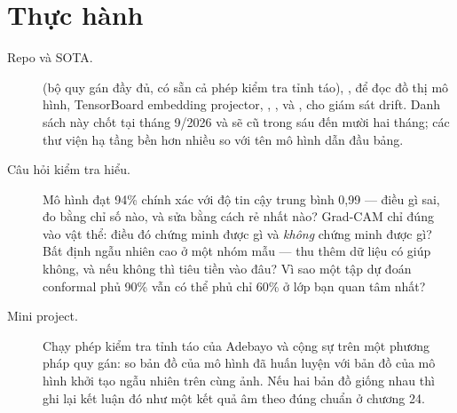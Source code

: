 \documentclass[../../deep_learning.tex]{subfiles}
\begin{document}
\section{Thực hành}
\begin{description}
\item[Repo và SOTA.]  (bộ quy gán đầy đủ, có sẵn cả phép kiểm tra tỉnh táo), ,  để đọc đồ thị mô hình, TensorBoard embedding projector, , ,  và ,  cho giám sát drift. Danh sách này chốt tại tháng 9/2026 và sẽ cũ trong sáu đến mười hai tháng; các thư viện hạ tầng bền hơn nhiều so với tên mô hình dẫn đầu bảng.
\item[Câu hỏi kiểm tra hiểu.] Mô hình đạt 94\% chính xác với độ tin cậy trung bình 0,99 --- điều gì sai, đo bằng chỉ số nào, và sửa bằng cách rẻ nhất nào? Grad-CAM chỉ đúng vào vật thể: điều đó chứng minh được gì và \emph{không} chứng minh được gì? Bất định ngẫu nhiên cao ở một nhóm mẫu --- thu thêm dữ liệu có giúp không, và nếu không thì tiêu tiền vào đâu? Vì sao một tập dự đoán conformal phủ 90\% vẫn có thể phủ chỉ 60\% ở lớp bạn quan tâm nhất?
\item[Mini project.] Chạy phép kiểm tra tỉnh táo của Adebayo và cộng sự trên một phương pháp quy gán: so bản đồ của mô hình đã huấn luyện với bản đồ của mô hình khởi tạo ngẫu nhiên trên cùng ảnh. Nếu hai bản đồ giống nhau thì ghi lại kết luận đó như một kết quả âm theo đúng chuẩn ở chương 24.
\end{description}
\end{document}
